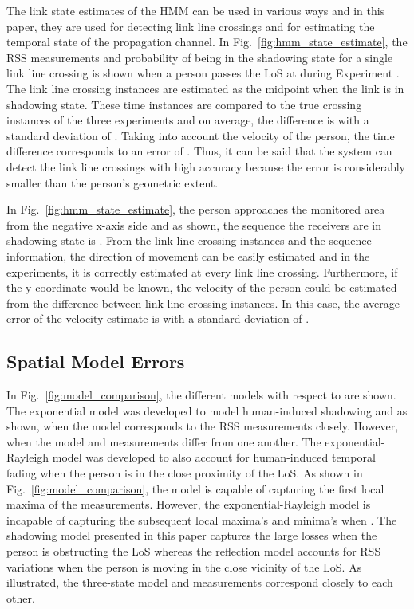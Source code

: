 \documentclass[journal, 10pt, twocolumn, balance]{IEEEtran}
\begin{document}
The link state estimates  of the HMM can be used in various ways and in this paper, they are used for detecting link line crossings and for estimating the temporal state of the propagation channel. In Fig.~\ref{fig:hmm_state_estimate}, the RSS measurements and probability of being in the shadowing state for a single link line crossing is shown when a person passes the LoS at  during Experiment . The link line crossing instances are estimated as the midpoint when the link is in shadowing state. These time instances are compared to the true crossing instances of the three experiments and on average, the difference is  with a standard deviation of . Taking into account the velocity of the person, the time difference corresponds to an error of . Thus, it can be said that the system can detect the link line crossings with high accuracy because the error is considerably smaller than the person's geometric extent.

In Fig.~\ref{fig:hmm_state_estimate}, the person approaches the monitored area from the negative x-axis side and as shown, the sequence the receivers are in shadowing state is . From the link line crossing instances and the sequence information, the direction of movement can be easily estimated and in the experiments, it is correctly estimated at every link line crossing. Furthermore, if the y-coordinate would be known, the velocity of the person could be estimated from the difference between link line crossing instances. In this case, the average error of the velocity estimate is  with a standard deviation of . 


\subsection{Spatial Model Errors}\label{sec:spatial_model_error}


In Fig.~\ref{fig:model_comparison}, the different models with respect to  are shown. The exponential model was developed to model human-induced shadowing and as shown, when  the model corresponds to the RSS measurements closely. However, when  the model and measurements differ from one another. The exponential-Rayleigh model was developed to also account for human-induced temporal fading when the person is in the close proximity of the LoS. As shown in Fig.~\ref{fig:model_comparison}, the model is capable of capturing the first local maxima of the measurements. However, the exponential-Rayleigh model is incapable of capturing the subsequent local maxima’s and minima’s when . The shadowing model presented in this paper captures the large losses when the person is obstructing the LoS whereas the reflection model accounts for RSS variations when the person is moving in the close vicinity of the LoS. As illustrated, the three-state model and measurements correspond closely to each other.
\end{document}
